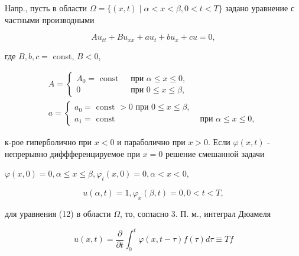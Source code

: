 \documentclass[10pt]{article}
\begin{document}
Напр., пусть в области $\Omega=\{(x, t) \mid \alpha<x<\beta, 0<t<T\}$ задано уравнение с частными производными



\[

A u_{t t}+B u_{x x}+a u_{t}+b u_{x}+c u=0,

\]



где $B, b, c=$ const, $B<0$,



\[

\begin{gathered}

A=\left\{\begin{array}{cc}

A_{0}=\text { const } & \text { при } \alpha \leqslant x \leqslant 0, \\

0 & \text { при } 0 \leqslant x \leqslant \beta,

\end{array}\right. \\

a= \begin{cases}a_{0}=\text { const }>0 \text { при } 0 \leqslant x \leqslant \beta, \\

a_{1}=\text { const } & \text { при } \alpha \leqslant x \leqslant 0,\end{cases}

\end{gathered}

\]



к-рое гиперболично при $x<0$ и параболично при $x>0$. Если $\varphi(x, t)$ - непрерывно диффференцируемое при $x=0$ решение смешанной задачи



$\varphi(x, 0)=0, \alpha \leqslant x \leqslant \beta, \varphi_{t}(x, 0)=0, \alpha<x<0$,



\[

u(\alpha, t)=1, \varphi_{x}(\beta, t)=0,0<t<T,

\]



для уравнения (12) в области $\Omega$, то, согласно 3. П. м., интеграл Дюамеля



\[

u(x, t)=\frac{\partial}{\partial t} \int_{0}^{t} \varphi(x, t-\tau) f(\tau) d \tau \equiv T f

\]
\end{document}
